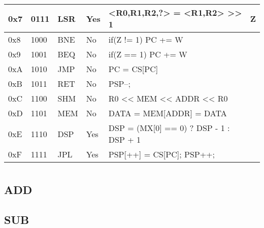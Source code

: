 \documentclass[a4paper]{article}
\begin{document}
\begin{table}[]
\begin{tabular}{|l|l|l|l|l|l|}
        0x7                 &   0111            &   LSR                 &   Yes                 &   <R0,R1,R2,?> = <R1,R2> >> 1             &   Z                       \\ \hline  
        0x8                 &   1000            &   BNE                 &   No                  &   if(Z != 1) PC += W                      &                           \\ \hline  
        0x9                 &   1001            &   BEQ                 &   No                  &   if(Z == 1) PC += W                      &                           \\ \hline  
        0xA                 &   1010            &   JMP                 &   No                  &   PC = CS[PC]                             &                           \\ \hline  
        0xB                 &   1011            &   RET                 &   No                  &   PSP--;                             &                           \\ \hline  
        0xC                 &   1100            &   SHM                 &   No                  &   R0 << MEM << ADDR << R0                 &                           \\ \hline  
        0xD                 &   1101            &   MEM                 &   No                  &   DATA = MEM[ADDR] = DATA                 &                           \\ \hline  
        0xE                 &   1110            &   DSP                 &   Yes                 &   DSP = (MX[0] == 0) ? DSP - 1 : DSP + 1     &                           \\ \hline  
        0xF                 &   1111            &   JPL                 &   Yes                 &   PSP[++] = CS[PC]; PSP++;                     &                      \\ \hline  
    \end{tabular}
\end{table}


\section{}

\subsection{ADD}

\subsection{SUB}
\end{document}
